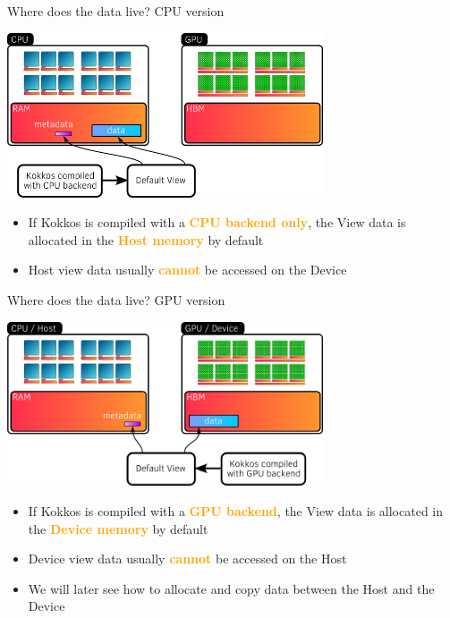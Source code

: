 \documentclass[aspectratio=169]{beamer}
\newcommand{\highlight}[1]{\textcolor{orange}{\textbf{#1}}}
\begin{document}

\begin{frame}{Where does the data live? CPU version}
    \begin{center}
        \includegraphics[width=0.7\textwidth]{host_view_memory.png}
    \end{center}
    \begin{itemize}
        \item If Kokkos is compiled with a \highlight{CPU backend only}, the View data is allocated in the \highlight{Host memory} by default
        \item Host view data usually \highlight{cannot} be accessed on the Device
    \end{itemize}
\end{frame}


\begin{frame}{Where does the data live? GPU version}
    \begin{center}
        \includegraphics[width=0.7\textwidth]{device_view_memory.png}
    \end{center}
    \begin{itemize}
        \item If Kokkos is compiled with a \highlight{GPU backend}, the View data is allocated in the \highlight{Device memory} by default
        \item Device view data usually \highlight{cannot} be accessed on the Host
        \item We will later see how to allocate and copy data between the Host and the Device
    \end{itemize}
\end{frame}
\end{document}
